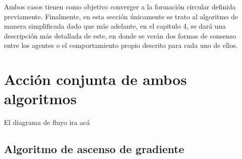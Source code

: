 Ambos casos tienen como objetivo converger a la formación circular definida previamente. Finalmente, en esta sección únicamente se trato al algoritmo de manera simplificada dado que más adelante, en el capitulo 4, se dará una descripción más detallada de este, en donde se verán dos formas de consenso entre los agentes o el comportamiento propio descrito para cada uno de ellos.

\section{Acción conjunta de ambos algoritmos}

El diagrama de fluyo ira acá

\subsection{Algoritmo de ascenso de gradiente}


